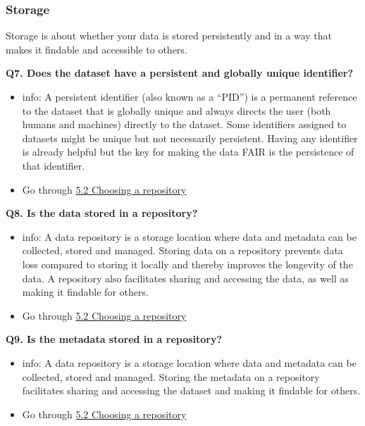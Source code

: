 \documentclass[
]{book}
\providecommand{\tightlist}{%
  \setlength{\itemsep}{0pt}\setlength{\parskip}{0pt}}
\begin{document}
\hypertarget{storage}{%
\subsubsection*{Storage}\label{storage}}

Storage is about whether your data is stored persistently and in a way that makes it findable and accessible to others.

\textbf{Q7. Does the dataset have a persistent and globally unique identifier?}

\begin{itemize}
\tightlist
\item
  info: A persistent identifier (also known as a ``PID'') is a permanent reference to the dataset that is globally unique and always directs the user (both humans and machines) directly to the dataset. Some identifiers assigned to datasets might be unique but not necessarily persistent. Having any identifier is already helpful but the key for making the data FAIR is the persistence of that identifier.
\item
  Go through \protect\hyperlink{choosing-a-repository}{5.2 Choosing a repository}
\end{itemize}

\textbf{Q8. Is the data stored in a repository?}

\begin{itemize}
\tightlist
\item
  info: A data repository is a storage location where data and metadata can be collected, stored and managed. Storing data on a repository prevents data loss compared to storing it locally and thereby improves the longevity of the data. A repository also facilitates sharing and accessing the data, as well as making it findable for others.
\item
  Go through \protect\hyperlink{choosing-a-repository}{5.2 Choosing a repository}
\end{itemize}

\textbf{Q9. Is the metadata stored in a repository?}

\begin{itemize}
\tightlist
\item
  info: A data repository is a storage location where data and metadata can be collected, stored and managed. Storing the metadata on a repository facilitates sharing and accessing the dataset and making it findable for others.
\item
  Go through \protect\hyperlink{choosing-a-repository}{5.2 Choosing a repository}
\end{itemize}
\end{document}
